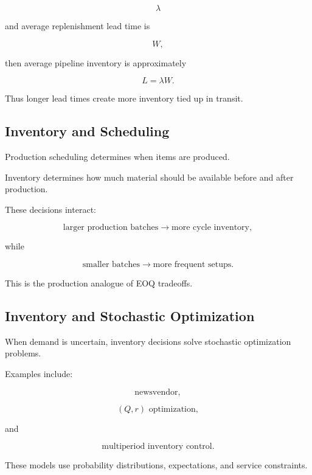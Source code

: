 \[
\lambda
\]

and average replenishment lead time is

\[
W,
\]

then average pipeline inventory is approximately

\[
\boxed{
L
=
\lambda W.
}
\]

Thus longer lead times create more inventory tied up in transit.

\subsection{Inventory and Scheduling}
\label{subsec:inventory-scheduling-connection}

Production scheduling determines when items are produced.

Inventory determines how much material should be available before and
after production.

These decisions interact:

\[
\boxed{
\text{larger production batches}
\rightarrow
\text{more cycle inventory},
}
\]

while

\[
\boxed{
\text{smaller batches}
\rightarrow
\text{more frequent setups}.
}
\]

This is the production analogue of EOQ tradeoffs.

\subsection{Inventory and Stochastic Optimization}
\label{subsec:inventory-stochastic-optimization}

When demand is uncertain, inventory decisions solve stochastic
optimization problems.

Examples include:

\[
\boxed{
\text{newsvendor},
}
\]

\[
\boxed{
(Q,r)\text{ optimization},
}
\]

and

\[
\boxed{
\text{multiperiod inventory control}.
}
\]

These models use probability distributions, expectations, and service
constraints.

